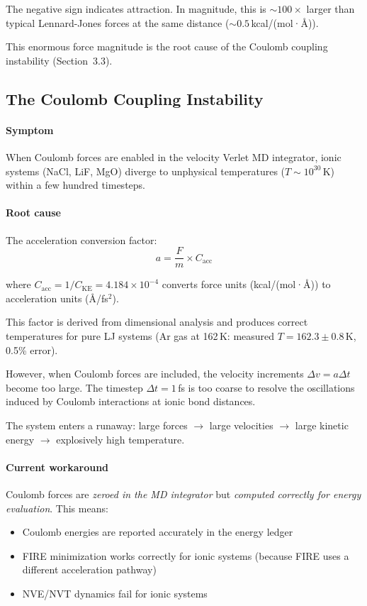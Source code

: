 \documentclass[11pt]{article}
\begin{document}
The negative sign indicates attraction. In magnitude, this is $\sim 100\times$ larger than typical Lennard-Jones forces at the same distance ($\sim 0.5$\,kcal/(mol·\AA)).

This enormous force magnitude is the root cause of the Coulomb coupling instability (Section~3.3).

\subsection{The Coulomb Coupling Instability}

\paragraph{Symptom} When Coulomb forces are enabled in the velocity Verlet MD integrator, ionic systems (NaCl, LiF, MgO) diverge to unphysical temperatures ($T \sim 10^{30}$\,K) within a few hundred timesteps.

\paragraph{Root cause} The acceleration conversion factor:
\begin{equation}
a = \frac{F}{m} \times C_{\text{acc}}
\end{equation}

where $C_{\text{acc}} = 1/C_{\text{KE}} = 4.184 \times 10^{-4}$ converts force units (kcal/(mol·\AA)) to acceleration units (\AA/fs$^2$).

This factor is derived from dimensional analysis and produces correct temperatures for pure LJ systems (Ar gas at 162\,K: measured $T = 162.3 \pm 0.8$\,K, 0.5\% error).

However, when Coulomb forces are included, the velocity increments $\Delta v = a \Delta t$ become too large. The timestep $\Delta t = 1$\,fs is too coarse to resolve the oscillations induced by Coulomb interactions at ionic bond distances.

The system enters a runaway: large forces $\to$ large velocities $\to$ large kinetic energy $\to$ explosively high temperature.

\paragraph{Current workaround} Coulomb forces are \textit{zeroed in the MD integrator} but \textit{computed correctly for energy evaluation}. This means:
\begin{itemize}
\item Coulomb energies are reported accurately in the energy ledger
\item FIRE minimization works correctly for ionic systems (because FIRE uses a different acceleration pathway)
\item NVE/NVT dynamics fail for ionic systems
\end{itemize}
\end{document}
